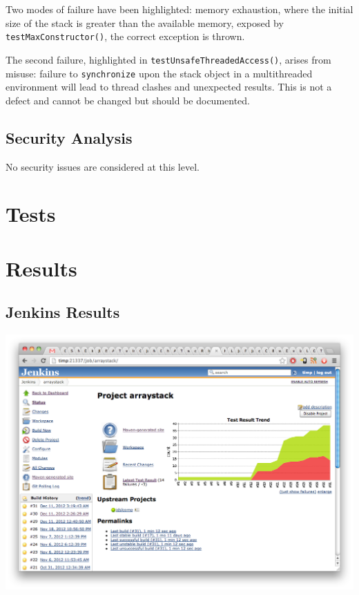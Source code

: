 \documentclass [12pt, a4paper, twoside, titlepage] {article}
\begin{document}
Two modes of failure have been highlighted: memory exhaustion, where the initial size of the stack is greater than the available memory, exposed by \texttt{testMaxConstructor()}, the correct exception is thrown. 

The second failure, highlighted in \texttt{testUnsafeThreadedAccess()}, arises from misuse: 
failure to \texttt{synchronize} upon the stack object in a multithreaded environment 
will lead to thread clashes and unexpected results. This is not a defect and cannot be changed but should be documented.

\subsection{Security Analysis}

No security issues are considered at this level.

\section{Tests}
\lstset{ caption=Tests, label=tests}


\lstset{ caption=ArrayStackTest, label=ArrayStackTest}

\lstset{ caption=FixedArrayStackTest, label=FixedArrayStackTest}


\section{Results}
\subsection{Jenkins Results}
\includegraphics[width=18cm]{JenkinsResults.png}
\end{document}
